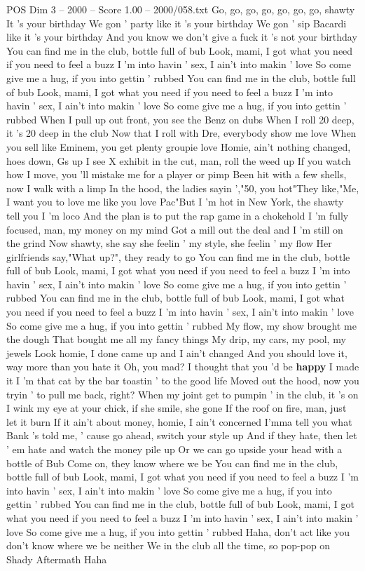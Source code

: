 \begin{textsample}{POS Dim 3 – 2000 – Score 1.00 – 2000/058.txt}  \label{ex:f3_pos_036}
Go, go, go, go, go, go, go, shawty It 's your birthday We gon ' party like it 's your birthday We gon ' sip Bacardi like it 's your birthday And you know we don't give a fuck it 's not your birthday You can find me in the club, bottle full of bub Look, mami, I got what you need if you need to feel a buzz I 'm into havin ' sex, I ain't into makin ' love So come give me a hug, if you into gettin ' rubbed You can find me in the club, bottle full of bub Look, mami, I got what you need if you need to feel a buzz I 'm into havin ' sex, I ain't into makin ' love So come give me a hug, if you into gettin ' rubbed When I pull up out front, you see the Benz on dubs When I roll 20 deep, it 's 20 deep in the club Now that I roll with Dre, everybody show me love When you sell like Eminem, you get plenty groupie love Homie, ain't nothing changed, hoes down, Gs up I see X exhibit in the cut, man, roll the weed up If you watch how I move, you 'll mistake me for a player or pimp Been hit with a few shells, now I walk with a limp In the hood, the ladies sayin ',"50, you hot"They like,"Me, I want you to love me like you love Pac"But I 'm hot in New York, the shawty tell you I 'm loco And the plan is to put the rap game in a chokehold I 'm fully focused, man, my money on my mind Got a mill out the deal and I 'm still on the grind Now shawty, she say she feelin ' my style, she feelin ' my flow Her girlfriends say,"What up?", they ready to go You can find me in the club, bottle full of bub Look, mami, I got what you need if you need to feel a buzz I 'm into havin ' sex, I ain't into makin ' love So come give me a hug, if you into gettin ' rubbed You can find me in the club, bottle full of bub Look, mami, I got what you need if you need to feel a buzz I 'm into havin ' sex, I ain't into makin ' love So come give me a hug, if you into gettin ' rubbed My flow, my show brought me the dough That bought me all my fancy things My drip, my cars, my pool, my jewels Look homie, I done came up and I ain't changed And you should love it, way more than you hate it Oh, you mad?
I thought that you 'd be \textbf{happy} I made it I 'm that cat by the bar toastin ' to the good life Moved out the hood, now you tryin ' to pull me back, right?
When my joint get to pumpin ' in the club, it 's on I wink my eye at your chick, if she smile, she gone If the roof on fire, man, just let it burn If it ain't about money, homie, I ain't concerned I'mma tell you what Bank 's told me, ' cause go ahead, switch your style up And if they hate, then let ' em hate and watch the money pile up Or we can go upside your head with a bottle of Bub Come on, they know where we be You can find me in the club, bottle full of bub Look, mami, I got what you need if you need to feel a buzz I 'm into havin ' sex, I ain't into makin ' love So come give me a hug, if you into gettin ' rubbed You can find me in the club, bottle full of bub Look, mami, I got what you need if you need to feel a buzz I 'm into havin ' sex, I ain't into makin ' love So come give me a hug, if you into gettin ' rubbed Haha, don't act like you don't know where we be neither We in the club all the time, so pop-pop on Shady Aftermath Haha

\end{textsample}
